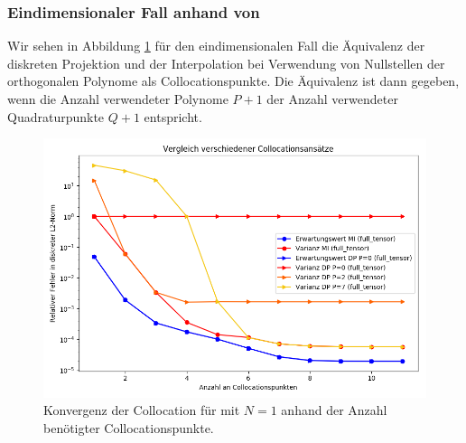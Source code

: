 \subsubsection*{Eindimensionaler Fall anhand von }
Wir sehen in Abbildung \ref{fig:collocation_comparison_trial7} für den eindimensionalen Fall die Äquivalenz der diskreten Projektion und der Interpolation bei Verwendung von Nullstellen der orthogonalen Polynome als Collocationspunkte. Die Äquivalenz ist dann gegeben, wenn die Anzahl verwendeter Polynome $P+1$ der Anzahl verwendeter Quadraturpunkte $Q+1$ entspricht.
\begin{figure}[!htb]
\includegraphics[width=\textwidth]{Figures/collocation_midp_trial7.png}
\caption{Konvergenz der Collocation für  mit $N=1$ anhand der Anzahl benötigter Collocationspunkte.}
\label{fig:collocation_comparison_trial7}
\end{figure}

